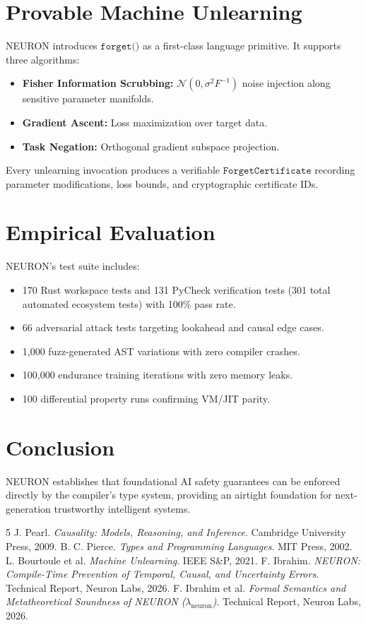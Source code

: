 \documentclass[11pt,twocolumn]{article}
\begin{document}
\section{Provable Machine Unlearning}
NEURON introduces $\texttt{forget()}$ as a first-class language primitive. It supports three algorithms:
\begin{itemize}
  \item \textbf{Fisher Information Scrubbing:} $\mathcal{N}(0, \sigma^2 F^{-1})$ noise injection along sensitive parameter manifolds.
  \item \textbf{Gradient Ascent:} Loss maximization over target data.
  \item \textbf{Task Negation:} Orthogonal gradient subspace projection.
\end{itemize}
Every unlearning invocation produces a verifiable $\texttt{ForgetCertificate}$ recording parameter modifications, loss bounds, and cryptographic certificate IDs.

\section{Empirical Evaluation}
NEURON's test suite includes:
\begin{itemize}
  \item 170 Rust workspace tests and 131 PyCheck verification tests (301 total automated ecosystem tests) with 100\% pass rate.
  \item 66 adversarial attack tests targeting lookahead and causal edge cases.
  \item 1,000 fuzz-generated AST variations with zero compiler crashes.
  \item 100,000 endurance training iterations with zero memory leaks.
  \item 100 differential property runs confirming VM/JIT parity.
\end{itemize}

\section{Conclusion}
NEURON establishes that foundational AI safety guarantees can be enforced directly by the compiler's type system, providing an airtight foundation for next-generation trustworthy intelligent systems.


\begin{thebibliography}{5}
 J. Pearl. \textit{Causality: Models, Reasoning, and Inference}. Cambridge University Press, 2009.
 B. C. Pierce. \textit{Types and Programming Languages}. MIT Press, 2002.
 L. Bourtoule et al. \textit{Machine Unlearning}. IEEE S\&P, 2021.
 F. Ibrahim. \textit{NEURON: Compile-Time Prevention of Temporal, Causal, and Uncertainty Errors}. Technical Report, Neuron Labs, 2026.
 F. Ibrahim et al. \textit{Formal Semantics and Metatheoretical Soundness of NEURON ($\lambda_{\text{neuron}}$)}. Technical Report, Neuron Labs, 2026.
\end{thebibliography}
\end{document}
